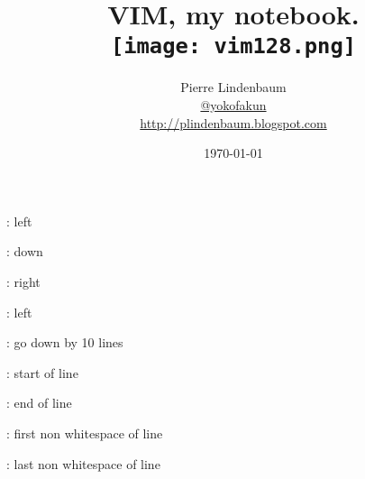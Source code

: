 \documentclass{article}
\date{\today}
\title{VIM, my notebook.\\\texttt{[image: vim128.png]}}
\author{Pierre Lindenbaum\\\href{https://twitter.com/yokofakun}{@yokofakun}\\\url{http://plindenbaum.blogspot.com} }
\newcommand{\vikeystroke}[2]{ #1 : #2

}
\begin{document}
\maketitle
\Huge
\vikeystroke{}{left}
\vikeystroke{}{down}
\vikeystroke{}{right}
\vikeystroke{}{left}
\vikeystroke{}{go down by 10 lines}


\vikeystroke{}{start of line}
\vikeystroke{\keystroke{\$}}{end of line}
\vikeystroke{\keystroke{\textasciicircum}}{first non whitespace of line}
\vikeystroke{}{last non whitespace of line}
\end{document}

